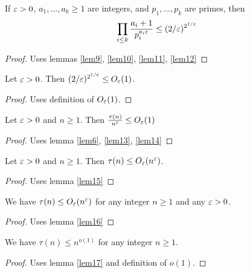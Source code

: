 \begin{lemma} \label{lem13} 
If $\varepsilon>0$, $a_1,\ldots,a_k\ge1$ are integers, and $p_1,\ldots, p_k$ are primes, then 
\[
\prod_{i\le k}\frac{a_i+1}{p_i^{a_i \varepsilon}} \le (2/\varepsilon)^{2^{1/\varepsilon}}
\]
\end{lemma}
\begin{proof}\leanok
{}
Uses lemmas \ref{lem9}, \ref{lem10}, \ref{lem11}, \ref{lem12}
\end{proof}

\begin{lemma} \label{lem14} 
Let $\varepsilon>0$. Then $(2/\varepsilon)^{2^{1/\varepsilon}} \le O_\varepsilon(1)$.
\end{lemma}
\begin{proof}\leanok
\uses{}
Uses definition of $O_\varepsilon(1)$.
\end{proof}

\begin{lemma} \label{lem15} 
Let $\varepsilon>0$ and $n\ge1$. Then $\frac{\tau(n)}{n^\varepsilon}\le O_\varepsilon(1)$
\end{lemma}
\begin{proof}\leanok
{}
Uses lemma \ref{lem6}, \ref{lem13}, \ref{lem14}
\end{proof}

\begin{lemma} \label{lem16} 
Let $\varepsilon>0$ and $n\ge1$. Then $\tau(n) \le O_\varepsilon(n^\varepsilon)$.
\end{lemma}
\begin{proof}\leanok
{}
Uses lemma \ref{lem15}
\end{proof}

\begin{lemma} \label{lem17} 
We have $\tau(n) \le O_\varepsilon(n^\varepsilon)$ for any integer $n\ge1$ and any $\varepsilon>0$.
\end{lemma}
\begin{proof}\leanok
{}
Uses lemma \ref{lem16}
\end{proof}

\begin{theorem} \label{lem:div} \label{thm18} 
We have $\tau(n) \le n^{o(1)}$ for any integer $n\ge1$.
\end{theorem}
\begin{proof}\leanok
{}
Uses lemma \ref{lem17} and definition of $o(1)$.
\end{proof}


